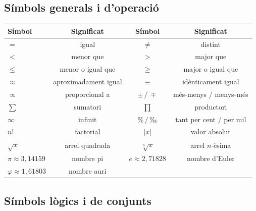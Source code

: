 \subsection*{Símbols generals i d'operació}

\begin{table}[H]
\centering
\renewcommand{\arraystretch}{1.25}
\begin{tabular}{lccc}
\toprule
Símbol & Significat & Símbol & Significat \\
\midrule
$=$ & igual & $\neq$ & distint \\
$<$ & menor que & $>$ & major que \\
$\le$ & menor o igual que & $\ge$ & major o igual que \\
$\approx$ & aproximadament igual & $\equiv$ & idènticament igual \\
$\propto$ & proporcional a & $\pm\,/\,\mp$ & més-menys / menys-més \\
$\sum$ & sumatori & $\prod$ & productori \\
$\infty$ & infinit & $\%\,/\,‰$ & tant per cent / per mil \\
$n!$ & factorial & $\lvert x\rvert$ & valor absolut \\
$\sqrt{x}$ & arrel quadrada & $\sqrt[n]{x}$ & arrel $n$-èsima \\
$\pi \approx 3{,}14159$ & nombre pi & $e \approx 2{,}71828$ & nombre d'Euler \\
$\varphi \approx 1{,}61803$ & nombre auri &  &  \\
\bottomrule
\end{tabular}
\end{table}

\subsection*{Símbols lògics i de conjunts}

